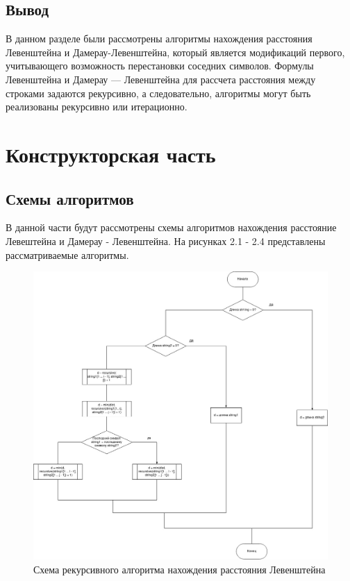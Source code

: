 \documentclass[12pt]{report}
\begin{document}
	\section{Вывод}
	В данном разделе были рассмотрены алгоритмы нахождения расстояния Левенштейна и Дамерау-Левенштейна, который является модификаций первого, учитывающего возможность перестановки соседних символов. Формулы Левенштейна и Дамерау — Левенштейна для рассчета расстояния между строками задаются рекурсивно, а следовательно, алгоритмы могут быть реализованы рекурсивно или итерационно.
	
	\clearpage
	
	\chapter{Конструкторская часть}
	
	\section{Схемы алгоритмов}
	В данной части будут рассмотрены схемы алгоритмов нахождения расстояние Левештейна и Дамерау - Левенштейна. На рисунках 2.1 - 2.4 представлены рассматриваемые алгоритмы.
	
	\begin{figure}[h]
		\centering
		\includegraphics[width=0.75\linewidth]{rec.jpg}
		\caption{Схема рекурсивного алгоритма нахождения расстояния Левенштейна}
		\label{fig:mpr}
	\end{figure}
	
\end{document}
